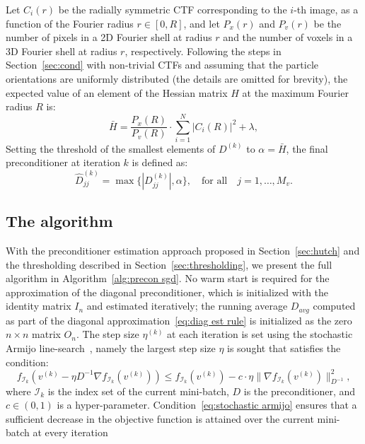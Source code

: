 \documentclass{article}
\DeclareMathOperator{\Ic}{\mathcal{I}}
\begin{document}
Let $C_i(r)$ be the radially symmetric CTF corresponding to the $i$-th image, as 
a function of the Fourier radius $r \in [0, R]$, and let $P_x(r)$ and $P_v(r)$ 
be the number of pixels in a 2D Fourier shell at radius $r$ and the number of voxels 
in a 3D Fourier shell at radius $r$, respectively.
Following the steps in Section~\ref{sec:cond} with non-trivial CTFs and assuming 
that the particle orientations are uniformly distributed (the details are omitted 
for brevity), the expected value of an element of the Hessian matrix $H$ at the 
maximum Fourier radius $R$ is:
\begin{equation}
    \bar{H} = \frac{P_x(R)}{P_v(R)} \cdot \sum_{i=1}^N |C_i(R)|^2 + \lambda,
    \label{eq:thresh value}
\end{equation}
Setting the threshold of the smallest elements of $D^{(k)}$ to $\alpha = \bar{H}$,
the final preconditioner at iteration $k$ is defined as: 
\begin{equation}
    \hat{D}^{(k)}_{jj} = \max\{|D^{(k)}_{jj}|, \alpha \}, 
    \quad \text{for all} \quad j = 1, \ldots, M_v.
    \label{eq:thresh}
\end{equation}

\subsection{The algorithm}
\label{sec:algorithm}

With the preconditioner estimation approach proposed in Section~\ref{sec:hutch}
and the thresholding described in Section~\ref{sec:thresholding}, we present the 
full algorithm in Algorithm~\ref{alg:precon sgd}. 
No warm start is required for the approximation of the diagonal preconditioner, 
which is initialized with the identity matrix $I_n$ and estimated iteratively;
the running average $D_{avg}$ computed as part of the diagonal 
approximation~\eqref{eq:diag est rule} is initialized as the 
zero $n \times n$ matrix $O_n$.
The step size $\eta^{(k)}$ at each iteration is set using the stochastic Armijo 
line-search~\cite{vaswani_adaptive_2021}, namely the largest step size $\eta$
is sought that satisfies the condition:
\begin{equation}
    f_{\Ic_k}\left(v^{(k)} - \eta D^{-1} \nabla f_{\Ic_k}(v^{(k)}) \right) 
    \leq f_{\Ic_k}(v^{(k)}) - c \cdot \eta \|\nabla f_{\Ic_k}(v^{(k)}) \|^2_{D^{-1}},
    \label{eq:stochastic armijo}
\end{equation}
where $\mathcal{I}_k$ is the index set of the current mini-batch, $D$ is
the preconditioner, and $c \in (0,1)$ is a hyper-parameter.
Condition~\eqref{eq:stochastic armijo} ensures that a sufficient decrease in the 
objective function is attained over the current mini-batch at every iteration
\end{document}

